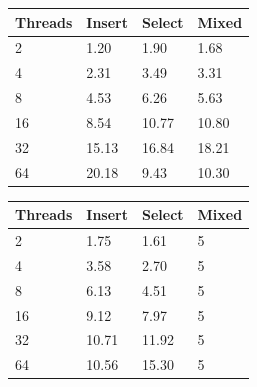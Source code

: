 \documentclass[conference, compsoc]{IEEEtran}
\begin{document}
\par\vspace{\baselineskip}
\begin{figure}[H]
\begin{center}
 \label{tab:memsqlScaling}
  \begin{tabular}{  l  l  l  l }
    \midrule
    \bf Threads & \bf Insert & \bf Select & \bf Mixed \\ \midrule
     2 & 1.20 & 1.90 & 1.68 \\ \midrule
     4 & 2.31 & 3.49 & 3.31 \\ \midrule
     8 & 4.53 & 6.26 & 5.63 \\ \midrule
     16 & 8.54 & 10.77 & 10.80 \\ \midrule
     32 & 15.13 & 16.84 & 18.21 \\ \midrule
     64 & 20.18 & 9.43 & 10.30 \\ \midrule
  \end{tabular}
\end{center}
\end{figure}

\par\vspace{\baselineskip}
\begin{figure}[H]
\begin{center}
 \label{tab:voltScaling}
  \begin{tabular}{  l  l  l  l }
    \midrule
    \bf Threads & \bf Insert & \bf Select & \bf Mixed \\ \midrule
     2 & 1.75 & 1.61 & 5 \\ \midrule
     4 & 3.58 & 2.70 & 5 \\ \midrule
     8 & 6.13 & 4.51 & 5 \\ \midrule
     16 & 9.12 & 7.97 & 5 \\ \midrule
     32 & 10.71 & 11.92 & 5 \\ \midrule
     64 & 10.56 & 15.30 & 5 \\ \midrule
  \end{tabular}
\end{center}
\end{figure}
\end{document}
